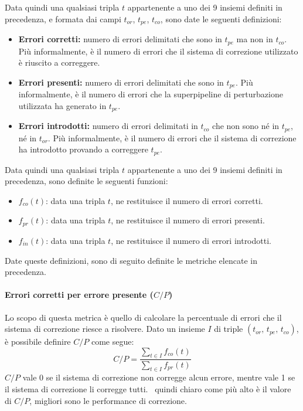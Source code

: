 Data quindi una qualsiasi tripla $t$ appartenente a uno dei 9 insiemi definiti in precedenza, e formata dai campi $t_{or}$, $t_{pe}$, $t_{co}$, sono date le seguenti definizioni:

\begin{itemize}
\item \textbf{Errori corretti:} numero di errori delimitati che sono in $t_{pe}$ ma non in $t_{co}$. Più informalmente, è il numero di errori che il sistema di correzione utilizzato è riuscito a correggere.
\item \textbf{Errori presenti:} numero di errori delimitati che sono in $t_{pe}$. Più informalmente, è il numero di errori che la superpipeline di perturbazione utilizzata ha generato in $t_{pe}$.
\item \textbf{Errori introdotti:} numero di errori delimitati in $t_{co}$ che non sono né in $t_{pe}$, né in $t_{or}$. Più informalmente, è il numero di errori che il sistema di correzione ha introdotto provando a correggere $t_{pe}$.
\end{itemize}

Data quindi una qualsiasi tripla $t$ appartenente a uno dei 9 insiemi definiti in precedenza, sono definite le seguenti funzioni:
\begin{itemize}
\item $f_{co}(t)$: data una tripla $t$, ne restituisce il numero di errori corretti.
\item $f_{pr}(t)$: data una tripla $t$, ne restituisce il numero di errori presenti.
\item $f_{in}(t)$: data una tripla $t$, ne restituisce il numero di errori introdotti.
\end{itemize}
\noindent
Date queste definizioni, sono di seguito definite le metriche elencate in precedenza.


\paragraph{Errori corretti per errore presente ($C/P$)} Lo scopo di questa metrica è quello di calcolare la percentuale di errori che il sistema di correzione riesce a risolvere. Dato un insieme $I$ di triple $(\text{$t_{or}$, $t_{pe}$, $t_{co}$})$, è possibile definire $C/P$ come segue:
\begin{equation}
C/P = \frac{
    \sum_{t \in I} f_{co}(t)
}{
	\sum_{t \in I} f_{pr}(t)
}
\end{equation}
$C/P$ vale 0 se il sistema di correzione non corregge alcun errore, mentre vale 1 se il sistema di correzione li corregge tutti. \E\ quindi chiaro come più alto è il valore di $C/P$, migliori sono le performance di correzione.


